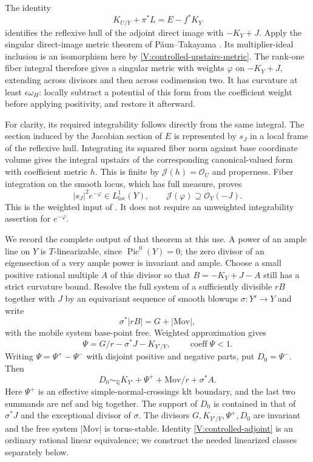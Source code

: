 The identity
\[
 K_{U/Y}+\pi^*L=E-f^*K_Y
\]
identifies the reflexive hull of the adjoint direct image with
$-K_Y+J$.  Apply the singular direct-image metric theorem of
P\u aun--Takayama \cite[Theorem~3.3.5]{PT2018}.  Its multiplier-ideal
inclusion is an isomorphism here by
\eqref{V:controlled-upstairs-metric}.  The rank-one fiber integral
therefore gives a singular metric with weights $\varphi$ on
$-K_Y+J$, extending across divisors and then across codimension two.
It has curvature at least $\epsilon\omega_H$: locally subtract a
potential of this form from the coefficient weight before applying
positivity, and restore it afterward.

For clarity, its required integrability follows directly from the same
integral.  The section induced by the Jacobian section of $E$ is
represented by $s_J$ in a local frame of the reflexive hull.  Integrating
its squared fiber norm against base coordinate volume gives the integral
upstairs of the corresponding canonical-valued form with coefficient
metric $h$.  This is finite by $\mathcal J(h)=\mathcal O_U$ and
properness.  Fiber integration on the smooth locus, which has full
measure, proves
\begin{equation}\label{V:controlled-weighted-integral}
 |s_J|^2e^{-\varphi}\in L^1_{\mathrm{loc}}(Y),
 \qquad \mathcal J(\varphi)\supseteq\mathcal O_Y(-J).
\end{equation}
This is the weighted input of \cite[Theorem~\textup{(Weighted anticanonical approximation)}]{CompanionE}.  It does not require an unweighted
integrability assertion for $e^{-\varphi}$.

We record the complete output of that theorem at this use.  A power of
an ample line on $Y$ is $T$-linearizable, since
$\operatorname{Pic}^0(Y)=0$; the zero divisor of an eigensection of a
very ample power is invariant and ample.  Choose a small positive
rational multiple $A$ of this divisor so that $B=-K_Y+J-A$ still has
a strict curvature bound.  Resolve the full
system of a sufficiently divisible $rB$ together with $J$ by an
equivariant sequence of smooth blowups $\sigma:Y'\to Y$ and write
\[
 \sigma^*|rB|=G+|\mathrm{Mov}|,
\]
with the mobile system base-point free.  Weighted approximation gives
\begin{equation}\label{V:controlled-signed-boundary}
 \Psi=G/r-\sigma^*J-K_{Y'/Y},\qquad
 \operatorname{coeff}\Psi<1.
\end{equation}
Writing $\Psi=\Psi^+-\Psi^-$ with disjoint positive and negative
parts, put $D_0=\Psi^-$.  Then
\begin{equation}\label{V:controlled-adjoint}
 D_0\sim_{\mathbb Q}K_{Y'}+\Psi^+
             +\mathrm{Mov}/r+\sigma^*A.
\end{equation}
Here $\Psi^+$ is an effective simple-normal-crossings klt boundary,
and the last two summands are nef and big together.  The support of
$D_0$ is contained in that of $\sigma^*J$ and the exceptional divisor
of $\sigma$.  The divisors $G,K_{Y'/Y},\Psi^+,D_0$ are invariant and
the free system $|\mathrm{Mov}|$ is torus-stable.  Identity
\eqref{V:controlled-adjoint} is an ordinary rational linear equivalence;
we construct the needed linearized classes separately below.

